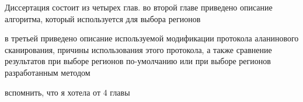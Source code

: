 \intro


Диссертация состоит из четырех глав. 
во второй главе приведено описание алгоритма, который используется для выбора регионов

в третьей приведено описание используемой модификации протокола аланинового сканирования, причины использования этого протокола, а также сравнение результатов при выборе регионов по-умолчанию или при выборе регионов разработанным методом 

вспомнить, что я хотела от 4 главы